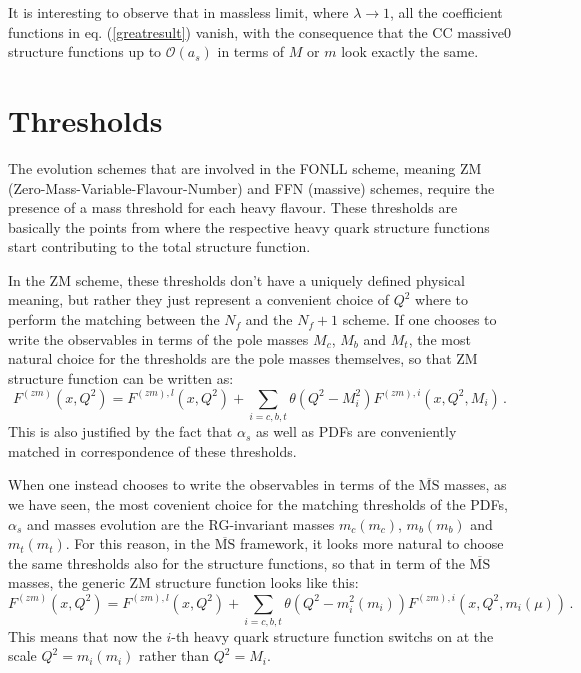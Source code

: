 \documentclass[10pt,a4paper]{article}
\begin{document}
It is interesting to observe that in massless limit, where $\lambda\rightarrow 1$, all the coefficient functions in eq. (\ref{greatresult}) vanish, with the consequence that the CC massive0 structure functions up to $\mathcal{O}(a_s)$ in terms of $M$ or $m$ look exactly the same.

\section{Thresholds}

The evolution schemes that are involved in the FONLL scheme, meaning ZM (Zero-Mass-Variable-Flavour-Number) and FFN (massive) schemes, require the presence of a mass threshold for each heavy flavour. These thresholds are basically the points from where the respective heavy quark structure functions start contributing to the total structure function.

In the ZM scheme, these thresholds don't have a uniquely defined
physical meaning, but rather they just represent a convenient choice
of $Q^2$ where to perform the matching between the $N_f$ and the
$N_f+1$ scheme. If one chooses to write the observables in terms of
the pole masses $M_c$, $M_b$ and $M_t$, the most natural choice for
the thresholds are the pole masses themselves, so that ZM structure
function can be written as:
\begin{equation}
F^{(zm)}(x,Q^2) = F^{(zm),l}(x,Q^2)+\sum_{i=c,b,t}\theta(Q^2-M_i^2)F^{(zm),i}(x,Q^2,M_i)\,.
\end{equation}
This is also justified by the fact that $\alpha_s$ as well as PDFs are
conveniently matched in correspondence of these thresholds.

When one instead chooses to write the observables in terms of the
$\overline{\mbox{MS}}$ masses, as we have seen, the most covenient
choice for the matching thresholds of the PDFs, $\alpha_s$ and masses
evolution are the RG-invariant masses $m_c(m_c)$, $m_b(m_b)$ and
$m_t(m_t)$. For this reason, in the $\overline{\mbox{MS}}$ framework,
it looks more natural to choose the same thresholds also for the
structure functions, so that in term of the $\overline{\mbox{MS}}$
masses, the generic ZM structure function looks like this:
\begin{equation}
F^{(zm)}(x,Q^2) = F^{(zm),l}(x,Q^2)+\sum_{i=c,b,t}\theta(Q^2-m_i^2(m_i))F^{(zm),i}(x,Q^2,m_i(\mu))\,.
\end{equation}
This means that now the $i$-th heavy quark structure function switchs on at the scale $Q^2=m_i(m_i)$ rather than $Q^2=M_i$.
\end{document}

